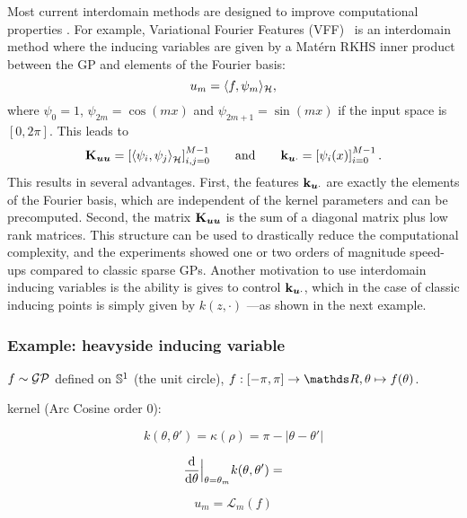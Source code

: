 Most current interdomain methods are designed to improve computational properties \citep{hensman2017variational,burt2020variational,Dutordoir2020spherical}. For example, Variational Fourier Features (VFF)~\citep{hensman2017variational} is an interdomain method where the inducing variables are given by a Mat\'ern RKHS inner product between the GP and elements of the Fourier basis:
\begin{equation*}
u_m = \langle f, \psi_m \rangle_{{\mathcal{H}}},
\end{equation*}
where $\psi_0 = 1$, $\psi_{2m}=\cos(m x)$ and $\psi_{2m+1}=\sin(m x)$ if the input space is $[0, 2 \pi]$. This leads to
\begin{equation*}
    \Kuu = \left[\langle \psi_i , \psi_{j} \rangle_\rkhs^{} \right]_{i, j = 0}^{M-1}\qquad\text{and}\qquad\kux = \left[ \psi_i(x)\right]_{i = 0}^{M-1}\, .
\end{equation*}
This results in several advantages. First, the features $\mathbf{k}_{\bm{u} \cdot}$ are exactly the elements of the Fourier basis, which are independent of the kernel parameters and can be precomputed. Second, the matrix $\mathbf{{K}}_{\bm{u} \bm{u}}$ is the sum of a diagonal matrix plus low rank matrices. This structure can be used to drastically reduce the computational complexity, and the experiments showed one or two orders of magnitude speed-ups compared to classic sparse GPs. Another motivation to use interdomain inducing variables is the ability is gives to control $\mathbf{k}_{\bm{u} \cdot}$, which in the case of classic inducing points is simply given by $k(z, \cdot)$ ---as shown in the next example.

\subsubsection*{Example: heavyside inducing variable}

$f \sim \mathcal{GP}$ defined on $\mathbb{S}^1$ (the unit circle), $f: [-\pi, \pi] \rightarrow \Reals, \theta \mapsto f(\theta)$.

kernel (Arc Cosine order 0):

\begin{equation}
  k(\theta, \theta') = \kappa(\rho) = \pi - |\theta - \theta'|
\end{equation}

\begin{equation}
  \frac{\mathrm{d}{}}{\mathrm{d}{\theta}}\Bigr|_{\theta = \theta_m} k(\theta, \theta') = 
\end{equation}

\begin{equation}
  u_m = \mathcal{L}_m(f)
\end{equation}


